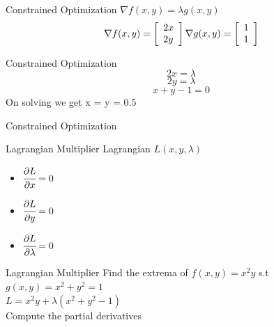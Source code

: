 \documentclass{beamer}
\begin{document}
\begin{frame}{Constrained Optimization}
    $\nabla f(x,y) = \lambda g(x,y)$ \\
    \vspace{1em}
    $$
   \nabla f(x, y)=\left[\begin{array}{l}
   	{2 x} \\
   	{2 y}
   \end{array}\right] 
    \vspace{1em} 
    \nabla g(x, y)=\left[\begin{array}{l}
    	{1} \\
    	{1}
    \end{array}\right]
    $$
\end{frame}

\begin{frame}{Constrained Optimization}
    \begin{equation}
        2x=\lambda
    \end{equation}
    \begin{equation}
        2y=\lambda
    \end{equation}
    \begin{equation}
        x + y - 1 = 0
    \end{equation}
    On solving we get x = y = 0.5
\end{frame}

\begin{frame}{Constrained Optimization}

\end{frame}


\begin{frame}{Lagrangian Multiplier}
    Lagrangian $L(x,y,\lambda)$
    \begin{itemize}
        \item $\cfrac{\partial L}{\partial x} = 0$
        \item $\cfrac{\partial L}{\partial y} = 0$
        \item $\cfrac{\partial L}{\partial \lambda} = 0$
    \end{itemize}
    
\end{frame}


\begin{frame}{Lagrangian Multiplier}
    Find the extrema of $f(x,y) =x^{2}y$ s.t $g(x,y)=x^{2}+y^{2} = 1$ \\
    \vspace{1em}
    $L = x^{2}y + \lambda (x^{2} + y^{2} - 1)$\\
    \vspace{1em}
    Compute the partial derivatives
\end{frame}
\end{document}
